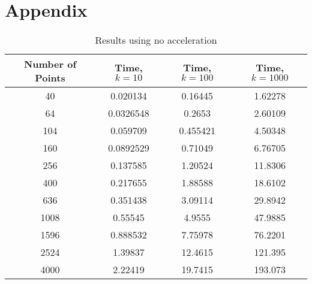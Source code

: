 
\section{Appendix}

\begin{table}[ht]
    \centering
    \begin{tabular}{| c | c c c |}
        \hline
        Number of Points  &  Time, $k=10$  & Time, $k=100$  &  Time, $k=1000$ \\
        \hline
        40  &  0.020134   &    0.16445     &     1.62278 \\
        64  &  0.0326548  &    0.2653      &     2.60109 \\
       104  &  0.059709   &    0.455421    &     4.50348 \\ 
       160  &  0.0892529  &    0.71049     &     6.76705 \\
       256  &  0.137585   &    1.20524     &    11.8306 \\
       400  &  0.217655   &    1.88588     &    18.6102 \\
       636  &  0.351438   &    3.09114     &    29.8942 \\
      1008  &  0.55545    &    4.9555      &    47.9885 \\
      1596  &  0.888532   &    7.75978     &    76.2201 \\
      2524  &  1.39837    &   12.4615      &   121.395 \\
      4000  &  2.22419    &   19.7415      &   193.073 \\
      \hline
    \end{tabular}
    \caption{Results using no acceleration}
    \label{tb:nothing}
\end{table}


